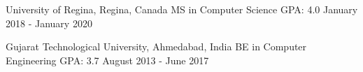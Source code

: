 

\begin{cventries}

  \cventry
    {University of Regina, Regina, Canada} %
    {MS in Computer Science} %
    {GPA: 4.0} %
    {January 2018 - January 2020} %
    {
    }

    \cventry
    {Gujarat Technological University, Ahmedabad, India} %
    {BE in Computer Engineering} %
    {GPA: 3.7} %
    {August 2013 - June 2017} %
    {
    }
    
\end{cventries}

